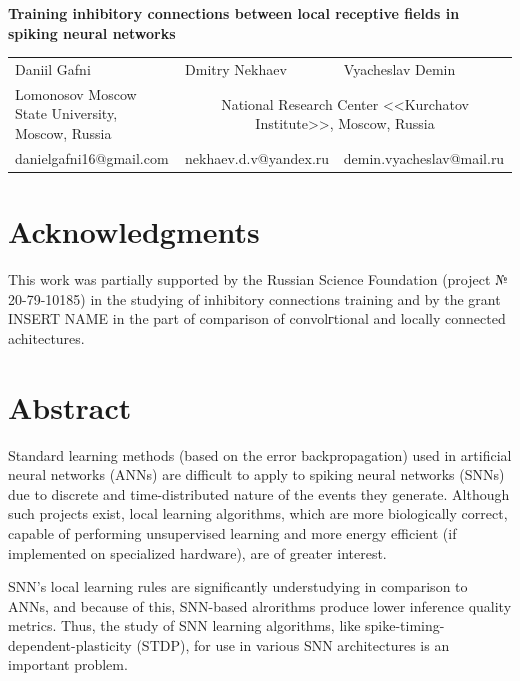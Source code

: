 \documentclass[a4paper,10pt]{article}
\begin{document}
\thispagestyle{empty}

\begin{center}
    \large\textbf{Training inhibitory connections between local receptive fields in spiking neural networks}\\
\end{center}

\begin{flushleft}
\begin{tabularx}{\textwidth}{m{4.3cm}m{4.3cm}m{4.3cm}}
Daniil Gafni & Dmitry Nekhaev & Vyacheslav Demin \\
\footnotesize{Lomonosov Moscow State University, Moscow, Russia} & \multicolumn{2}{c}{\footnotesize{National Research Center <<Kurchatov Institute>>, Moscow, Russia}} \bigstrut\\
\small{danielgafni16@gmail.com} & \small{nekhaev.d.v@yandex.ru} & \small{demin.vyacheslav@mail.ru}
\end{tabularx}
\end{flushleft}

\section*{Acknowledgments}
\small{This work was partially supported by the Russian Science Foundation (project № 20-79-10185) in the studying of inhibitory connections training and by the grant INSERT NAME in the part of comparison of convolгtional and locally connected achitectures.}


\section*{Abstract}
Standard learning methods (based on the error backpropagation) used in artificial neural networks (ANNs) are difficult to apply to spiking neural networks (SNNs) due to discrete and time-distributed nature of the events they generate. Although such projects exist, local learning algorithms, which are more biologically correct, capable of performing unsupervised learning and more energy efficient (if implemented on specialized hardware), are of greater interest.

SNN's local learning rules are significantly understudying in comparison to ANNs, and because of this, SNN-based alrorithms produce lower inference quality metrics. Thus, the study of SNN learning algorithms, like spike-timing-dependent-plasticity (STDP), for use in various SNN architectures is an important problem.
\end{document}
